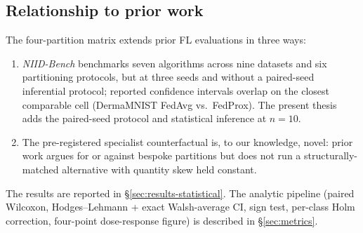 \subsection{Relationship to prior work}
\label{sec:stat-het-relwork}

The four-partition matrix extends prior FL evaluations in three ways:

\begin{enumerate}
  \item \emph{NIID-Bench} \citep{li2022niidbench} benchmarks seven
        algorithms across nine datasets and six partitioning
        protocols, but at three seeds and without a paired-seed
        inferential protocol; reported confidence intervals overlap
        on the closest comparable cell (DermaMNIST FedAvg vs.\
        FedProx). The present thesis adds the paired-seed protocol
        and statistical inference at $n=10$.
  \item The pre-registered specialist counterfactual is, to our
        knowledge, novel: prior work argues for or against bespoke
        partitions but does not run a structurally-matched alternative
        with quantity skew held constant.
\end{enumerate}

The results are reported in \S\ref{sec:results-statistical}. The
analytic pipeline (paired Wilcoxon, Hodges--Lehmann + exact
Walsh-average CI, sign test, per-class Holm correction, four-point
dose-response figure) is described in \S\ref{sec:metrics}.
